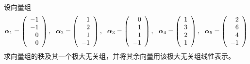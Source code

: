 \begin{frame}\ft{\subsecname}
  
  \begin{li}[$\bigstar\bigstar\bigstar\bigstar\bigstar$]
    设向量组
    $$
    \boldsymbol{\alpha}_1=\left(
      \begin{array}{r}
        -1\\-1\\0\\0
      \end{array}
    \right),~~ \boldsymbol{\alpha}_2=\left(
      \begin{array}{r}
        1\\2\\1\\-1
      \end{array}
    \right),~~ \boldsymbol{\alpha}_3=\left(
      \begin{array}{r}
        0\\1\\1\\-1
      \end{array}
    \right),~~ \boldsymbol{\alpha}_4=\left(
      \begin{array}{r}
        1\\3\\2\\1
      \end{array}
    \right),~~ \boldsymbol{\alpha}_5=\left(
      \begin{array}{r}
        2\\6\\4\\-1
      \end{array}
    \right)
    $$
    求向量组的秩及其一个极大无关组，并将其余向量用该极大无关组线性表示。
  \end{li}
  \pause


\end{frame}
